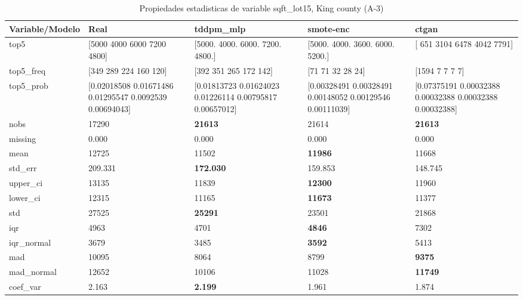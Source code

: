 \begin{table}[H]
\centering
\fontsize{8}{14}\selectfont
\caption{Propiedades  estadisticas de variable sqft\_lot15, King county (A-3)}
\label{table-stats-king county-a-3-sqft_lot15}
\begin{tabular}{|l|m{10em}|m{10em}|m{10em}|m{10em}|}
\hline
 \rowcolor[gray]{0.8}
Variable/Modelo & Real & tddpm\_mlp & smote-enc & ctgan \\
\hline top5 & [5000 4000 6000 7200 4800] & [5000. 4000. 6000. 7200. 4800.] & [5000. 4000. 3600. 6000. 5200.] & [ 651 3104 6478 4042 7791] \\
\hline top5\_freq & [349 289 224 160 120] & [392 351 265 172 142] & [71 71 32 28 24] & [1594    7    7    7    7] \\
\hline top5\_prob & [0.02018508 0.01671486 0.01295547 0.0092539  0.00694043] & [0.01813723 0.01624023 0.01226114 0.00795817 0.00657012] & [0.00328491 0.00328491 0.00148052 0.00129546 0.00111039] & [0.07375191 0.00032388 0.00032388 0.00032388 0.00032388] \\
\hline nobs & 17290 & \bfseries 21613 & \cellcolor[rgb]{0.9, 0.54, 0.52} 21614 & \bfseries 21613 \\
\hline missing & 0.000 & 0.000 & 0.000 & 0.000 \\
\hline mean & 12725 & \cellcolor[rgb]{0.9, 0.54, 0.52} 11502 & \bfseries 11986 & 11668 \\
\hline std\_err & 209.331 & \bfseries 172.030 & 159.853 & \cellcolor[rgb]{0.9, 0.54, 0.52} 148.745 \\
\hline upper\_ci & 13135 & \cellcolor[rgb]{0.9, 0.54, 0.52} 11839 & \bfseries 12300 & 11960 \\
\hline lower\_ci & 12315 & \cellcolor[rgb]{0.9, 0.54, 0.52} 11165 & \bfseries 11673 & 11377 \\
\hline std & 27525 & \bfseries 25291 & 23501 & \cellcolor[rgb]{0.9, 0.54, 0.52} 21868 \\
\hline iqr & 4963 & 4701 & \bfseries 4846 & \cellcolor[rgb]{0.9, 0.54, 0.52} 7302 \\
\hline iqr\_normal & 3679 & 3485 & \bfseries 3592 & \cellcolor[rgb]{0.9, 0.54, 0.52} 5413 \\
\hline mad & 10095 & \cellcolor[rgb]{0.9, 0.54, 0.52} 8064 & 8799 & \bfseries 9375 \\
\hline mad\_normal & 12652 & \cellcolor[rgb]{0.9, 0.54, 0.52} 10106 & 11028 & \bfseries 11749 \\
\hline coef\_var & 2.163 & \bfseries 2.199 & 1.961 & \cellcolor[rgb]{0.9, 0.54, 0.52} 1.874 \\

\end{tabular}
\end{table}

